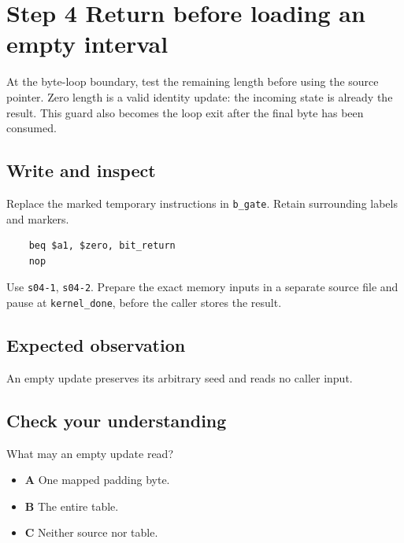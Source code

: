 \section{Step 4 Return before loading an empty interval}\label{crc-s04}

At the byte-loop boundary, test the remaining length before using the source pointer. Zero length is a valid identity update: the incoming state is already the result. This guard also becomes the loop exit after the final byte has been consumed.

\subsection{Write and inspect}
Replace the marked temporary instructions in \texttt{b\_gate}. Retain surrounding labels and markers.

\begin{verbatim}
    beq $a1, $zero, bit_return
    nop
\end{verbatim}

Use \texttt{s04-1}, \texttt{s04-2}. Prepare the exact memory inputs in a separate source file and pause at \texttt{kernel\_done}, before the caller stores the result.

\subsection{Expected observation}
An empty update preserves its arbitrary seed and reads no caller input.

\subsection{Check your understanding}
What may an empty update read?

\begin{itemize}
  \item \textbf{A} One mapped padding byte.
  \item \textbf{B} The entire table.
  \item \textbf{C} Neither source nor table.
\end{itemize}
